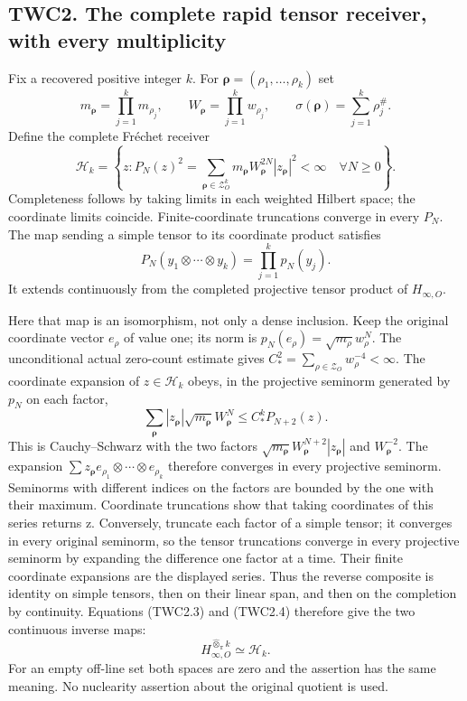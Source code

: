 \subsection{TWC2. The complete rapid tensor receiver, with every
multiplicity}\label{twc2.-the-complete-rapid-tensor-receiver-with-every-multiplicity}

Fix a recovered positive integer \(k\). For
\(\boldsymbol\rho=(\rho_1,\ldots,\rho_k)\) set \[
m_{\boldsymbol\rho}=\prod_{j=1}^km_{\rho_j},\qquad
W_{\boldsymbol\rho}=\prod_{j=1}^kw_{\rho_j},\qquad
\sigma(\boldsymbol\rho)=\sum_{j=1}^k\rho_j^\#.
\tag{TWC2.1}
\] Define the complete Fréchet receiver \[
\mathscr H_k=\left\{z:
P_N(z)^2=\sum_{\boldsymbol\rho\in\mathscr Z_O^k}
m_{\boldsymbol\rho}W_{\boldsymbol\rho}^{2N}|z_{\boldsymbol\rho}|^2<\infty
\quad\forall N\ge0\right\}.
\tag{TWC2.2}
\] Completeness follows by taking limits in each weighted Hilbert space;
the coordinate limits coincide. Finite-coordinate truncations converge
in every \(P_N\). The map sending a simple tensor to its coordinate
product satisfies \[
P_N(y_1\otimes\cdots\otimes y_k)=\prod_{j=1}^kp_N(y_j).
\tag{TWC2.3}
\] It extends continuously from the completed projective tensor product
of \(H_{\infty,O}\).

Here that map is an isomorphism, not only a dense inclusion. Keep the
original coordinate vector \(e_\rho\) of value one; its norm is
\(p_N(e_\rho)=\sqrt{m_\rho}w_\rho^N\). The unconditional actual
zero-count estimate gives
\(C_*^2=\sum_{\rho\in\mathscr Z_O}w_\rho^{-4}<\infty\). The coordinate
expansion of \(z\in\mathscr H_k\) obeys, in the projective seminorm
generated by \(p_N\) on each factor, \[
\sum_{\boldsymbol\rho}|z_{\boldsymbol\rho}|
\sqrt{m_{\boldsymbol\rho}}W_{\boldsymbol\rho}^{N}
\le C_*^k P_{N+2}(z).
\tag{TWC2.4}
\] This is Cauchy--Schwarz with the two factors
\(\sqrt{m_{\boldsymbol\rho}}W_{\boldsymbol\rho}^{N+2}|z_{\boldsymbol\rho}|\)
and \(W_{\boldsymbol\rho}^{-2}\). The expansion
\(\sum z_{\boldsymbol\rho}
 e_{\rho_1}\otimes\cdots\otimes e_{\rho_k}\) therefore converges in
every projective seminorm. Seminorms with different indices on the
factors are bounded by the one with their maximum. Coordinate
truncations show that taking coordinates of this series returns z.
Conversely, truncate each factor of a simple tensor; it converges in
every original seminorm, so the tensor truncations converge in every
projective seminorm by expanding the difference one factor at a time.
Their finite coordinate expansions are the displayed series. Thus the
reverse composite is identity on simple tensors, then on their linear
span, and then on the completion by continuity. Equations (TWC2.3) and
(TWC2.4) therefore give the two continuous inverse maps: \[
H_{\infty,O}^{\widehat\otimes_\pi k}\simeq\mathscr H_k.
\tag{TWC2.5}
\] For an empty off-line set both spaces are zero and the assertion has
the same meaning. No nuclearity assertion about the original quotient is
used.

